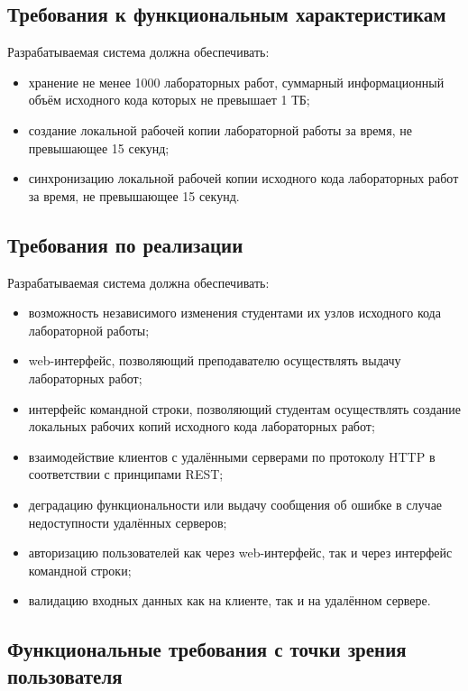 \documentclass{bmstu}
\begin{document}
  \subsection{Требования к функциональным характеристикам}

  Разрабатываемая система должна обеспечивать:
  \begin{itemize}[label=---]
    \item хранение не менее 1000 лабораторных работ, суммарный
      информационный объём исходного кода которых не превышает 1 ТБ;
    \item создание локальной рабочей копии лабораторной работы за
      время, не превышающее 15 секунд;
    \item синхронизацию локальной рабочей копии исходного кода
      лабораторных работ за время, не превышающее 15 секунд.
  \end{itemize}

  \subsection{Требования по реализации}

  Разрабатываемая система должна обеспечивать:
  \begin{itemize}[label=---]
    \item возможность независимого изменения студентами их узлов
      исходного кода лабораторной работы;
    \item web-интерфейс, позволяющий преподавателю осуществлять выдачу
      лабораторных работ;
    \item интерфейс командной строки, позволяющий студентам
      осуществлять создание локальных рабочих копий исходного кода
      лабораторных работ;
    \item взаимодействие клиентов с удалёнными серверами по протоколу
      HTTP в соответствии с принципами REST;
    \item деградацию функциональности или выдачу сообщения об ошибке в
      случае недоступности удалённых серверов;
    \item авторизацию пользователей как через web-интерфейс, так и
      через интерфейс командной строки;
    \item валидацию входных данных как на клиенте, так и на удалённом
      сервере.
  \end{itemize}

  \subsection{Функциональные требования с точки зрения пользователя}
\end{document}
